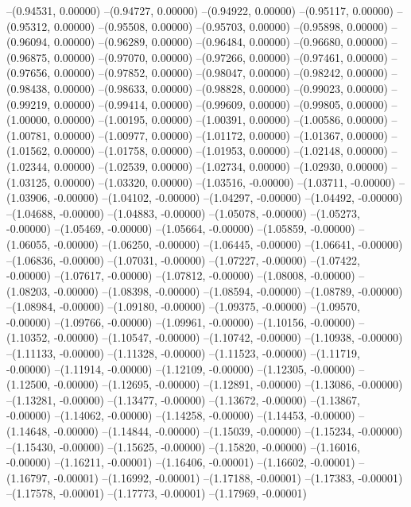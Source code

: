 --(0.94531, 0.00000)
--(0.94727, 0.00000)
--(0.94922, 0.00000)
--(0.95117, 0.00000)
--(0.95312, 0.00000)
--(0.95508, 0.00000)
--(0.95703, 0.00000)
--(0.95898, 0.00000)
--(0.96094, 0.00000)
--(0.96289, 0.00000)
--(0.96484, 0.00000)
--(0.96680, 0.00000)
--(0.96875, 0.00000)
--(0.97070, 0.00000)
--(0.97266, 0.00000)
--(0.97461, 0.00000)
--(0.97656, 0.00000)
--(0.97852, 0.00000)
--(0.98047, 0.00000)
--(0.98242, 0.00000)
--(0.98438, 0.00000)
--(0.98633, 0.00000)
--(0.98828, 0.00000)
--(0.99023, 0.00000)
--(0.99219, 0.00000)
--(0.99414, 0.00000)
--(0.99609, 0.00000)
--(0.99805, 0.00000)
--(1.00000, 0.00000)
--(1.00195, 0.00000)
--(1.00391, 0.00000)
--(1.00586, 0.00000)
--(1.00781, 0.00000)
--(1.00977, 0.00000)
--(1.01172, 0.00000)
--(1.01367, 0.00000)
--(1.01562, 0.00000)
--(1.01758, 0.00000)
--(1.01953, 0.00000)
--(1.02148, 0.00000)
--(1.02344, 0.00000)
--(1.02539, 0.00000)
--(1.02734, 0.00000)
--(1.02930, 0.00000)
--(1.03125, 0.00000)
--(1.03320, 0.00000)
--(1.03516, -0.00000)
--(1.03711, -0.00000)
--(1.03906, -0.00000)
--(1.04102, -0.00000)
--(1.04297, -0.00000)
--(1.04492, -0.00000)
--(1.04688, -0.00000)
--(1.04883, -0.00000)
--(1.05078, -0.00000)
--(1.05273, -0.00000)
--(1.05469, -0.00000)
--(1.05664, -0.00000)
--(1.05859, -0.00000)
--(1.06055, -0.00000)
--(1.06250, -0.00000)
--(1.06445, -0.00000)
--(1.06641, -0.00000)
--(1.06836, -0.00000)
--(1.07031, -0.00000)
--(1.07227, -0.00000)
--(1.07422, -0.00000)
--(1.07617, -0.00000)
--(1.07812, -0.00000)
--(1.08008, -0.00000)
--(1.08203, -0.00000)
--(1.08398, -0.00000)
--(1.08594, -0.00000)
--(1.08789, -0.00000)
--(1.08984, -0.00000)
--(1.09180, -0.00000)
--(1.09375, -0.00000)
--(1.09570, -0.00000)
--(1.09766, -0.00000)
--(1.09961, -0.00000)
--(1.10156, -0.00000)
--(1.10352, -0.00000)
--(1.10547, -0.00000)
--(1.10742, -0.00000)
--(1.10938, -0.00000)
--(1.11133, -0.00000)
--(1.11328, -0.00000)
--(1.11523, -0.00000)
--(1.11719, -0.00000)
--(1.11914, -0.00000)
--(1.12109, -0.00000)
--(1.12305, -0.00000)
--(1.12500, -0.00000)
--(1.12695, -0.00000)
--(1.12891, -0.00000)
--(1.13086, -0.00000)
--(1.13281, -0.00000)
--(1.13477, -0.00000)
--(1.13672, -0.00000)
--(1.13867, -0.00000)
--(1.14062, -0.00000)
--(1.14258, -0.00000)
--(1.14453, -0.00000)
--(1.14648, -0.00000)
--(1.14844, -0.00000)
--(1.15039, -0.00000)
--(1.15234, -0.00000)
--(1.15430, -0.00000)
--(1.15625, -0.00000)
--(1.15820, -0.00000)
--(1.16016, -0.00000)
--(1.16211, -0.00001)
--(1.16406, -0.00001)
--(1.16602, -0.00001)
--(1.16797, -0.00001)
--(1.16992, -0.00001)
--(1.17188, -0.00001)
--(1.17383, -0.00001)
--(1.17578, -0.00001)
--(1.17773, -0.00001)
--(1.17969, -0.00001)
